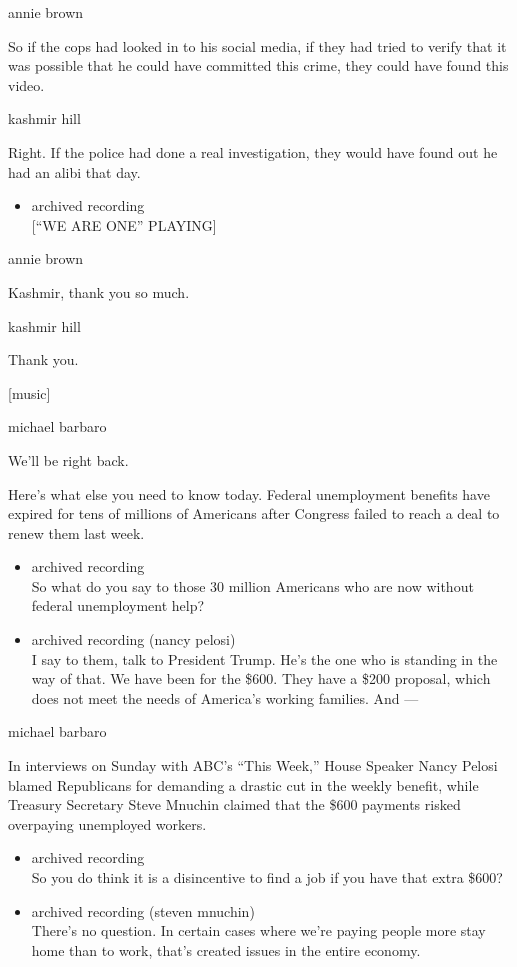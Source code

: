 annie brown

So if the cops had looked in to his social media, if they had tried to
verify that it was possible that he could have committed this crime,
they could have found this video.

kashmir hill

Right. If the police had done a real investigation, they would have
found out he had an alibi that day.

\begin{itemize}
\tightlist
\item
  archived recording\\
  {[}``WE ARE ONE'' PLAYING{]}
\end{itemize}

annie brown

Kashmir, thank you so much.

kashmir hill

Thank you.

{[}music{]}

michael barbaro

We'll be right back.

Here's what else you need to know today. Federal unemployment benefits
have expired for tens of millions of Americans after Congress failed to
reach a deal to renew them last week.

\begin{itemize}
\item
  archived recording\\
  So what do you say to those 30 million Americans who are now without
  federal unemployment help?
\item
  archived recording (nancy pelosi)\\
  I say to them, talk to President Trump. He's the one who is standing
  in the way of that. We have been for the \$600. They have a \$200
  proposal, which does not meet the needs of America's working families.
  And ---
\end{itemize}

michael barbaro

In interviews on Sunday with ABC's ``This Week,'' House Speaker Nancy
Pelosi blamed Republicans for demanding a drastic cut in the weekly
benefit, while Treasury Secretary Steve Mnuchin claimed that the \$600
payments risked overpaying unemployed workers.

\begin{itemize}
\item
  archived recording\\
  So you do think it is a disincentive to find a job if you have that
  extra \$600?
\item
  archived recording (steven mnuchin)\\
  There's no question. In certain cases where we're paying people more
  stay home than to work, that's created issues in the entire economy.
\end{itemize}

